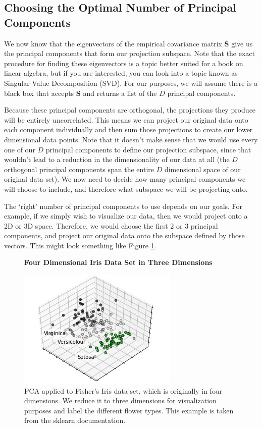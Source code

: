 \subsection{Choosing the Optimal Number of Principal Components}
We now know that the eigenvectors of the empirical covariance matrix $\textbf{S}$ give us the principal components that form our projection subspace. Note that the exact procedure for finding these eigenvectors is a topic better suited for a book on linear algebra, but if you are interested, you can look into a topic known as Singular Value Decomposition (SVD). For our purposes, we will assume there is a black box that accepts $\textbf{S}$ and returns a list of the $D$ principal components.

Because these principal components are orthogonal, the projections they produce will be entirely uncorrelated. This means we can project our original data onto each component individually and then sum those projections to create our lower dimensional data points. Note that it doesn't make sense that we would use every one of our $D$ principal components to define our projection subspace, since that wouldn't lead to a reduction in the dimensionality of our data at all (the $D$ orthogonal principal components span the entire $D$ dimensional space of our original data set). We now need to decide how many principal components we will choose to include, and therefore what subspace we will be projecting onto.

The `right' number of principal components to use depends on our goals. For example, if we simply wish to visualize our data, then we would project onto a 2D or 3D space. Therefore, we would choose the first 2 or 3 principal components, and project our original data onto the subspace defined by those vectors. This might look something like Figure \ref{fig:dim-red-iris}.

\begin{figure}
    \centering
    \textbf{Four Dimensional Iris Data Set in Three Dimensions}\par\medskip
    \includegraphics[width=0.5\paperwidth]{../DimensionalityReduction/fig/dim-red-iris.png}
    \caption{PCA applied to Fisher's Iris data set, which is originally in four dimensions. We reduce it to three dimensions for visualization purposes and label the different flower types. This example is taken from the sklearn documentation.}
    \label{fig:dim-red-iris}
\end{figure}

